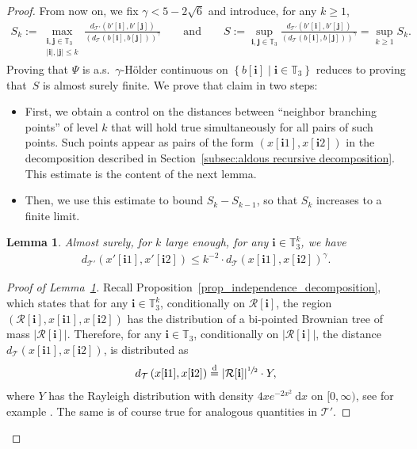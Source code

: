 \documentclass[11pt]{article}
\newcommand{\enstq}[2]{\left\lbrace#1\mathrel{}\middle|\mathrel{}#2\right\rbrace}
\newcommand{\intervalle}[4]{\mathopen{#1}#2\mathclose{}\mathpunct{},#3\mathclose{#4}}
\newcommand{\intervallefo}[2]{\intervalle{[}{#1}{#2}{)}}
\newcommand{\Tt}{\mathcal{T}}
\newcommand{\ii}{\mathbf{i}}
\newcommand{\jj}{\mathbf{j}}
\theoremstyle{plain}
\newtheorem{lemma}[theorem]{Lemma}
\theoremstyle{definition}
\numberwithin{equation}{section}
\begin{document}
\begin{proof}
From now on, we fix $\gamma < 5-2\sqrt{6}$ and introduce, for any $k\geq 1$,
\begin{align*}
S_k := \max_{\substack{\ii, \jj\in \mathbb{T}_3 \\ |\ii|, |\jj| \leq k}} \frac{d_{\Tt'}(b'[\ii],b'[\jj])}{ \left(d_{\Tt}(b[\ii],b[\jj])\right)^\gamma} \qquad \text{and} \qquad S := \sup_{\ii, \jj\in \mathbb{T}_3} \frac{d_{\Tt'}(b'[\ii],b'[\jj])}{ \left(d_{\Tt}(b[\ii],b[\jj])\right)^\gamma}= \sup_{k\geq 1} S_k.
\end{align*}
Proving that $\Psi$ is a.s.\ $\gamma$-Hölder continuous on $\enstq{b[\ii]}{ \ii\in \mathbb T_3}$ reduces to proving that~$S$ is almost surely finite.
We prove that claim in two steps:
\begin{itemize}
\item First, we obtain a control on the distances between ``neighbor branching points'' of level $k$ that will hold true simultaneously for all pairs of such points.
Such points appear as pairs of the form $(x[\ii1], x[\ii2])$ in the decomposition described in Section~\ref{subsec:aldous recursive decomposition}.
This estimate is the content of the next lemma.
\item Then, we use this estimate to bound $S_k-S_{k-1}$, so that $S_k$ increases to a finite limit.
\end{itemize}
\begin{lemma}\label{lem:distance neighbouring points}
Almost surely, for $k$ large enough, for any $\ii\in \mathbb{T}_3^k$, we have\vspace*{-3pt}
\begin{align}\label{eq:distance estimate for neighbouring points}
d_{\Tt'} \left( x'[\ii1],x'[\ii2] \right) \leq k^{-2}\cdot d_{\Tt}( x[\ii1],x[\ii2])^\gamma.
\end{align}
\end{lemma}
\begin{proof}[Proof of Lemma~\ref{lem:distance neighbouring points}]
Recall Proposition~\ref{prop_independence_decomposition}, which states that for any $\ii\in \mathbb{T}_3^k$, conditionally on $\mathcal{R}[\ii]$, the region $(\mathcal{R}[\ii], x[\ii1],x[\ii2])$ has the distribution of a bi-pointed Brownian tree of mass $|\mathcal{R}[\ii]|$. Therefore, for any $\ii\in \mathbb{T}_3$, conditionally on $|\mathcal{R}[\ii]|$, the distance $d_{\Tt} \left( x[\ii1],x[\ii2] \right)$, is distributed as\vspace*{-3pt}
\begin{align*}
d_{\Tt} \left( x[\ii1],x[\ii2] \right) \overset{\mathrm{d}}{=}|\mathcal{R}[\ii]|^{\sfrac{1}{2}} \cdot Y,
\end{align*}
where $Y$ has the Rayleigh distribution with density $4xe^{-2x^2}\ \mathrm{d}x$ on $\intervallefo{0}{\infty}$, see for example \cite[Th.\,2.11]{legall_random_2005}.
The same is of course true for analogous quantities in $\Tt'$.


\end{proof}
\end{proof}
\end{document}
